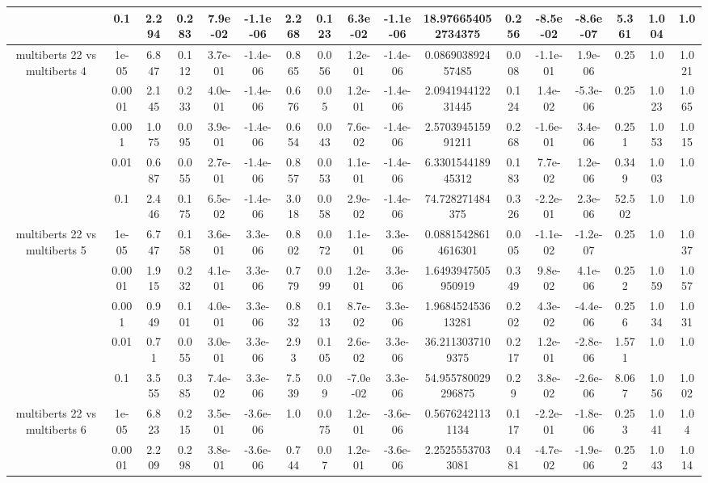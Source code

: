 \begin{tabular}{|c|c|c|c|c|c|c|c|c|c|c|c|c|c|c|c|c|}
 & 0.1 & 2.294 & 0.283 & 7.9e-02 & -1.1e-06 & 2.268 & 0.123 & 6.3e-02 & -1.1e-06 & 18.976654052734375 & 0.256 & -8.5e-02 & -8.6e-07 & 5.361 & 1.004 & 1.0 \\
\hline
\multirow{5}{*}{multiberts 22 vs multiberts 4} & 1e-05 & 6.847 & 0.112 & 3.7e-01 & -1.4e-06 & 0.865 & 0.056 & 1.2e-01 & -1.4e-06 & 0.086903892457485 & 0.008 & -1.1e-01 & 1.9e-06 & 0.25 & 1.0 & 1.021 \\
 & 0.0001 & 2.145 & 0.233 & 4.0e-01 & -1.4e-06 & 0.676 & 0.05 & 1.2e-01 & -1.4e-06 & 2.094194412231445 & 0.124 & 1.4e-02 & -5.3e-06 & 0.25 & 1.023 & 1.065 \\
 & 0.001 & 1.075 & 0.095 & 3.9e-01 & -1.4e-06 & 0.654 & 0.043 & 7.6e-02 & -1.4e-06 & 2.570394515991211 & 0.268 & -1.6e-01 & 3.4e-06 & 0.251 & 1.053 & 1.015 \\
 & 0.01 & 0.687 & 0.055 & 2.7e-01 & -1.4e-06 & 0.857 & 0.053 & 1.1e-01 & -1.4e-06 & 6.330154418945312 & 0.183 & 7.7e-02 & 1.2e-06 & 0.349 & 1.003 & 1.0 \\
 & 0.1 & 2.446 & 0.175 & 6.5e-02 & -1.4e-06 & 3.018 & 0.058 & 2.9e-02 & -1.4e-06 & 74.728271484375 & 0.326 & -2.2e-01 & 2.3e-06 & 52.502 & 1.0 & 1.0 \\
\hline
\multirow{5}{*}{multiberts 22 vs multiberts 5} & 1e-05 & 6.747 & 0.158 & 3.6e-01 & 3.3e-06 & 0.802 & 0.072 & 1.1e-01 & 3.3e-06 & 0.08815428614616301 & 0.005 & -1.1e-02 & -1.2e-07 & 0.25 & 1.0 & 1.037 \\
 & 0.0001 & 1.915 & 0.232 & 4.1e-01 & 3.3e-06 & 0.779 & 0.099 & 1.2e-01 & 3.3e-06 & 1.6493947505950919 & 0.349 & 9.8e-02 & 4.1e-06 & 0.252 & 1.059 & 1.057 \\
 & 0.001 & 0.949 & 0.101 & 4.0e-01 & 3.3e-06 & 0.832 & 0.113 & 8.7e-02 & 3.3e-06 & 1.968452453613281 & 0.202 & 4.3e-02 & -4.4e-06 & 0.256 & 1.034 & 1.031 \\
 & 0.01 & 0.71 & 0.055 & 3.0e-01 & 3.3e-06 & 2.93 & 0.105 & 2.6e-02 & 3.3e-06 & 36.2113037109375 & 0.217 & 1.2e-01 & -2.8e-06 & 1.571 & 1.0 & 1.0 \\
 & 0.1 & 3.555 & 0.385 & 7.4e-02 & 3.3e-06 & 7.539 & 0.09 & -7.0e-02 & 3.3e-06 & 54.955780029296875 & 0.29 & 3.8e-02 & -2.6e-06 & 8.067 & 1.056 & 1.002 \\
\hline
\multirow{5}{*}{multiberts 22 vs multiberts 6} & 1e-05 & 6.823 & 0.215 & 3.5e-01 & -3.6e-06 & 1.0 & 0.075 & 1.2e-01 & -3.6e-06 & 0.56762421131134 & 0.117 & -2.2e-01 & -1.8e-06 & 0.253 & 1.041 & 1.04 \\
 & 0.0001 & 2.209 & 0.298 & 3.8e-01 & -3.6e-06 & 0.744 & 0.07 & 1.2e-01 & -3.6e-06 & 2.25255537033081 & 0.481 & -4.7e-02 & -1.9e-06 & 0.252 & 1.043 & 1.014 \\

\end{tabular}
